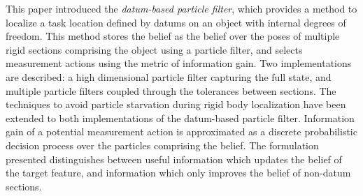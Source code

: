 \documentclass[../thesis.tex]{subfiles}
\begin{document}
This paper introduced the \textit{datum-based particle filter}, which provides a method to localize a task location defined by datums on an object with internal degrees of freedom.
This method stores the belief as the belief over the poses of multiple rigid sections comprising the object using a particle filter, and selects measurement actions using the metric of information gain.
Two implementations are described: a high dimensional particle filter capturing the full state, and multiple particle filters coupled through the tolerances between sections.
The techniques to avoid particle starvation during rigid body localization have been extended to both implementations of the datum-based particle filter. 
Information gain of a potential measurement action is approximated as a discrete probabilistic decision process over the particles comprising the belief.
The formulation presented distinguishes between useful information which updates the belief of the target feature, and information which only improves the belief of non-datum sections.
\end{document}
